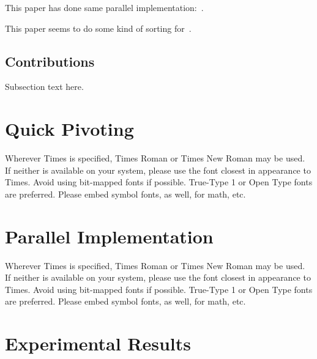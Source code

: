 \documentclass[10pt, conference, compsocconf]{IEEEtran}
\begin{document}
This paper has done same parallel implementation:~\cite{soliman2008memory}.

This paper seems to do some kind of sorting for~\cite{zhou1995parallel}.

\subsection{Contributions}
Subsection text here.


\section{Quick Pivoting}
Wherever Times is specified, Times Roman or Times New Roman may be used. If neither is available on your system, please use the font closest in appearance to Times. Avoid using bit-mapped fonts if possible. True-Type 1 or Open Type fonts are preferred. Please embed symbol fonts, as well, for math, etc.




\section{Parallel Implementation}
Wherever Times is specified, Times Roman or Times New Roman may be used. If neither is available on your system, please use the font closest in appearance to Times. Avoid using bit-mapped fonts if possible. True-Type 1 or Open Type fonts are preferred. Please embed symbol fonts, as well, for math, etc.



\section{Experimental Results}

%
%
\end{document}
